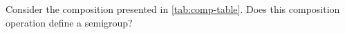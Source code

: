 \begin{gradedexercise}
	\label{ex:CompositionTable}
	Consider the composition presented in \cref{tab:comp-table}.
	Does this composition operation define a semigroup?
\end{gradedexercise}


